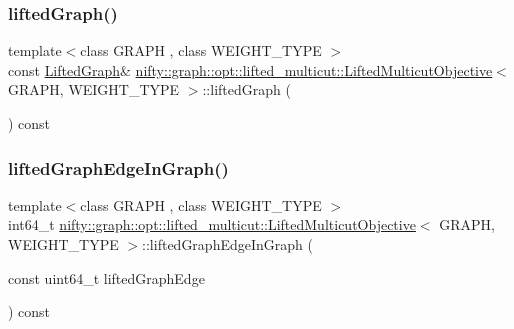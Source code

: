 \subsubsection{\texorpdfstring{lifted\+Graph()}{liftedGraph()}}
{\footnotesize\ttfamily template$<$class G\+R\+A\+PH , class W\+E\+I\+G\+H\+T\+\_\+\+T\+Y\+PE $>$ \\
const \hyperlink{classnifty_1_1graph_1_1opt_1_1lifted__multicut_1_1LiftedMulticutObjective_a560fc2d21604ab9e3e23496d47839ff9}{Lifted\+Graph}\& \hyperlink{classnifty_1_1graph_1_1opt_1_1lifted__multicut_1_1LiftedMulticutObjective}{nifty\+::graph\+::opt\+::lifted\+\_\+multicut\+::\+Lifted\+Multicut\+Objective}$<$ G\+R\+A\+PH, W\+E\+I\+G\+H\+T\+\_\+\+T\+Y\+PE $>$\+::lifted\+Graph (\begin{DoxyParamCaption}{ }\end{DoxyParamCaption}) const\hspace{0.3cm}{\ttfamily [inline]}}

\mbox{\label{classnifty_1_1graph_1_1opt_1_1lifted__multicut_1_1LiftedMulticutObjective_a5f1291a372c36fe2ce47098fd2b7df6d}} 
\subsubsection{\texorpdfstring{lifted\+Graph\+Edge\+In\+Graph()}{liftedGraphEdgeInGraph()}}
{\footnotesize\ttfamily template$<$class G\+R\+A\+PH , class W\+E\+I\+G\+H\+T\+\_\+\+T\+Y\+PE $>$ \\
int64\+\_\+t \hyperlink{classnifty_1_1graph_1_1opt_1_1lifted__multicut_1_1LiftedMulticutObjective}{nifty\+::graph\+::opt\+::lifted\+\_\+multicut\+::\+Lifted\+Multicut\+Objective}$<$ G\+R\+A\+PH, W\+E\+I\+G\+H\+T\+\_\+\+T\+Y\+PE $>$\+::lifted\+Graph\+Edge\+In\+Graph (\begin{DoxyParamCaption}\item[{const uint64\+\_\+t}]{lifted\+Graph\+Edge }\end{DoxyParamCaption}) const\hspace{0.3cm}{\ttfamily [inline]}}

